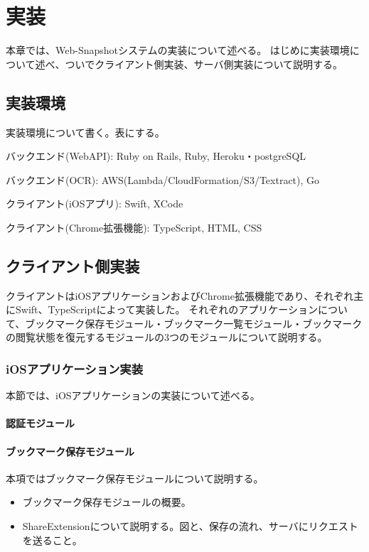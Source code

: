 \chapter{実装}
\label{chap:implementation}
本章では、Web-Snapshotシステムの実装について述べる。
はじめに実装環境について述べ、ついでクライアント側実装、サーバ側実装について説明する。

\section{実装環境}
実装環境について書く。表にする。

バックエンド(WebAPI): Ruby on Rails, Ruby, Heroku・postgreSQL

バックエンド(OCR): AWS(Lambda/CloudFormation/S3/Textract), Go

クライアント(iOSアプリ): Swift, XCode

クライアント(Chrome拡張機能): TypeScript, HTML, CSS

\section{クライアント側実装}
クライアントはiOSアプリケーションおよびChrome拡張機能であり、それぞれ主にSwift、TypeScriptによって実装した。
それぞれのアプリケーションについて、ブックマーク保存モジュール・ブックマーク一覧モジュール・ブックマークの閲覧状態を復元するモジュールの3つのモジュールについて説明する。

\subsection{iOSアプリケーション実装}
本節では、iOSアプリケーションの実装について述べる。

\subsubsection{認証モジュール}
\subsubsection{ブックマーク保存モジュール}
本項ではブックマーク保存モジュールについて説明する。
\begin{itemize}
  \item ブックマーク保存モジュールの概要。
  \item ShareExtensionについて説明する。図と、保存の流れ、サーバにリクエストを送ること。
\end{itemize}

